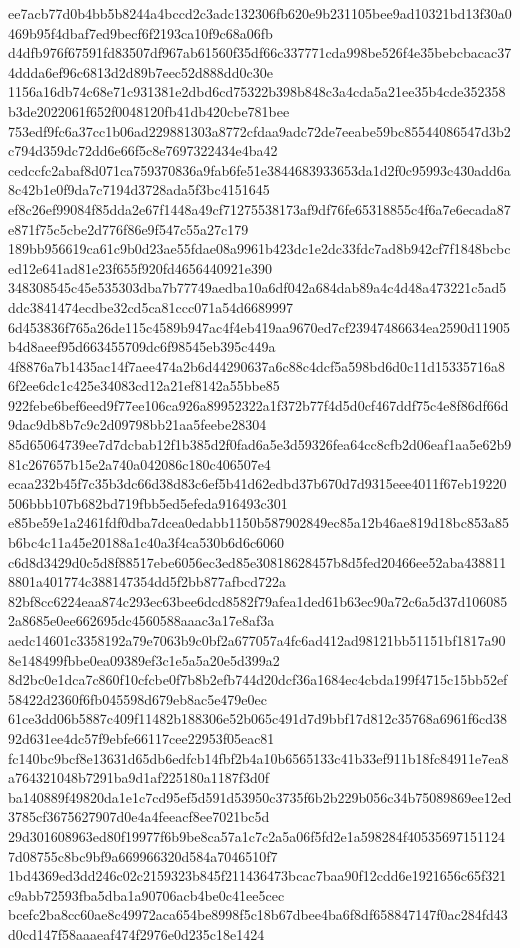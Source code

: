 \documentclass[11pt,a4paper]{article}
\begin{document}
{ee7acb77d0b4bb5b8244a4bccd2c3adc132306fb620e9b231105bee9ad10321bd13f30a0469b95f4dbaf7ed9becf6f2193ca10f9c68a06fb
d4dfb976f67591fd83507df967ab61560f35df66c337771cda998be526f4e35bebcbacac374ddda6ef96c6813d2d89b7eec52d888dd0c30e
1156a16db74c68e71c931381e2dbd6cd75322b398b848c3a4cda5a21ee35b4cde352358b3de2022061f652f0048120fb41db420cbe781bee
753edf9fc6a37cc1b06ad229881303a8772cfdaa9adc72de7eeabe59bc85544086547d3b2c794d359dc72dd6e66f5c8e7697322434e4ba42
cedccfc2abaf8d071ca759370836a9fab6fe51e3844683933653da1d2f0c95993c430add6a8c42b1e0f9da7c7194d3728ada5f3bc4151645
ef8c26ef99084f85dda2e67f1448a49cf71275538173af9df76fe65318855c4f6a7e6ecada87e871f75c5cbe2d776f86e9f547c55a27c179
189bb956619ca61c9b0d23ae55fdae08a9961b423dc1e2dc33fdc7ad8b942cf7f1848bcbced12e641ad81e23f655f920fd4656440921e390
348308545c45e535303dba7b77749aedba10a6df042a684dab89a4c4d48a473221c5ad5ddc3841474ecdbe32cd5ca81ccc071a54d6689997
6d453836f765a26de115c4589b947ac4f4eb419aa9670ed7cf23947486634ea2590d11905b4d8aeef95d663455709dc6f98545eb395c449a
4f8876a7b1435ac14f7aee474a2b6d44290637a6c88c4dcf5a598bd6d0c11d15335716a86f2ee6dc1c425e34083cd12a21ef8142a55bbe85
922febe6bef6eed9f77ee106ca926a89952322a1f372b77f4d5d0cf467ddf75c4e8f86df66d9dac9db8b7c9c2d09798bb21aa5feebe28304
85d65064739ee7d7dcbab12f1b385d2f0fad6a5e3d59326fea64cc8cfb2d06eaf1aa5e62b981c267657b15e2a740a042086c180c406507e4
ecaa232b45f7c35b3dc66d38d83c6ef5b41d62edbd37b670d7d9315eee4011f67eb19220506bbb107b682bd719fbb5ed5efeda916493c301
e85be59e1a2461fdf0dba7dcea0edabb1150b587902849ec85a12b46ae819d18bc853a85b6bc4c11a45e20188a1c40a3f4ca530b6d6c6060
c6d8d3429d0c5d8f88517ebe6056ec3ed85e30818628457b8d5fed20466ee52aba4388118801a401774c388147354dd5f2bb877afbcd722a
82bf8cc6224eaa874c293ec63bee6dcd8582f79afea1ded61b63ec90a72c6a5d37d1060852a8685e0ee662695dc4560588aaac3a17e8af3a
aedc14601c3358192a79e7063b9c0bf2a677057a4fc6ad412ad98121bb51151bf1817a908e148499fbbe0ea09389ef3c1e5a5a20e5d399a2
8d2bc0e1dca7c860f10cfcbe0f7b8b2efb744d20dcf36a1684ec4cbda199f4715c15bb52ef58422d2360f6fb045598d679eb8ac5e479e0ec
61ce3dd06b5887c409f11482b188306e52b065c491d7d9bbf17d812c35768a6961f6cd3892d631ee4dc57f9ebfe66117cee22953f05eac81
fc140bc9bcf8e13631d65db6edfcb14fbf2b4a10b6565133c41b33ef911b18fc84911e7ea8a764321048b7291ba9d1af225180a1187f3d0f
ba140889f49820da1e1c7cd95ef5d591d53950c3735f6b2b229b056c34b75089869ee12ed3785cf3675627907d0e4a4feeacf8ee7021bc5d
29d301608963ed80f19977f6b9be8ca57a1c7c2a5a06f5fd2e1a598284f405356971511247d08755c8bc9bf9a669966320d584a7046510f7
1bd4369ed3dd246c02c2159323b845f211436473bcac7baa90f12cdd6e1921656c65f321c9abb72593fba5dba1a90706acb4be0c41ee5cec
bcefc2ba8cc60ae8c49972aca654be8998f5c18b67dbee4ba6f8df658847147f0ac284fd43d0cd147f58aaaeaf474f2976e0d235c18e1424
}
\end{document}
